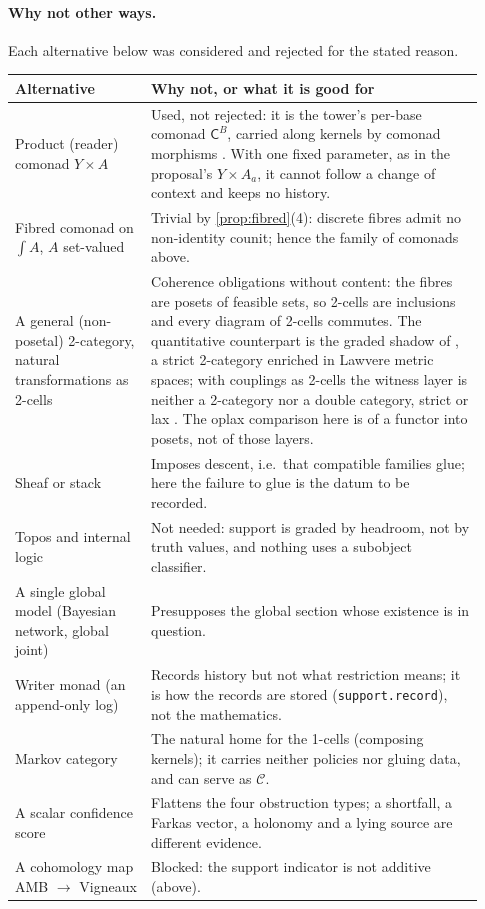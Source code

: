 \documentclass[11pt]{article}
\theoremstyle{definition}
\theoremstyle{remark}
\begin{document}
\paragraph{Why not other ways.} Each alternative below was considered and rejected for the stated reason.
\begin{center}\small
\begin{tabular}{>{\raggedright\arraybackslash}p{0.27\linewidth}>{\raggedright\arraybackslash}p{0.66\linewidth}}
\toprule
Alternative & Why not, or what it is good for\\
\midrule
Product (reader) comonad $Y\times A$ & Used, not rejected: it is the tower's per-base comonad $\mathsf C^B$, carried along kernels by comonad morphisms \cite[Prop.~9.14]{Tower}. With one fixed parameter, as in the proposal's $Y\times A_a$, it cannot follow a change of context and keeps no history.\\
Fibred comonad on $\int\!A$, $A$ set-valued & Trivial by \cref{prop:fibred}(4): discrete fibres admit no non-identity counit; hence the family of comonads above.\\
A general (non-posetal) 2-category, natural transformations as 2-cells & Coherence obligations without content: the fibres are posets of feasible sets, so 2-cells are inclusions and every diagram of 2-cells commutes. The quantitative counterpart is the graded shadow of \cite[Thm.~7.8]{Attribution}, a strict 2-category enriched in Lawvere metric spaces; with couplings as 2-cells the witness layer is neither a 2-category \cite[Thm.~7.6]{Attribution} nor a double category, strict or lax \cite{Algebras}. The oplax comparison here is of a functor into posets, not of those layers.\\
Sheaf or stack & Imposes descent, i.e.\ that compatible families glue; here the failure to glue is the datum to be recorded.\\
Topos and internal logic & Not needed: support is graded by headroom, not by truth values, and nothing uses a subobject classifier.\\
A single global model (Bayesian network, global joint) & Presupposes the global section whose existence is in question.\\
Writer monad (an append-only log) & Records history but not what restriction means; it is how the records are stored (\texttt{support.record}), not the mathematics.\\
Markov category \cite{Fritz2020} & The natural home for the 1-cells (composing kernels); it carries neither policies nor gluing data, and can serve as $\mathcal C$.\\
A scalar confidence score & Flattens the four obstruction types; a shortfall, a Farkas vector, a holonomy and a lying source are different evidence.\\
A cohomology map AMB $\to$ Vigneaux & Blocked: the support indicator is not additive (above).\\
\bottomrule
\end{tabular}
\end{center}
\end{document}
